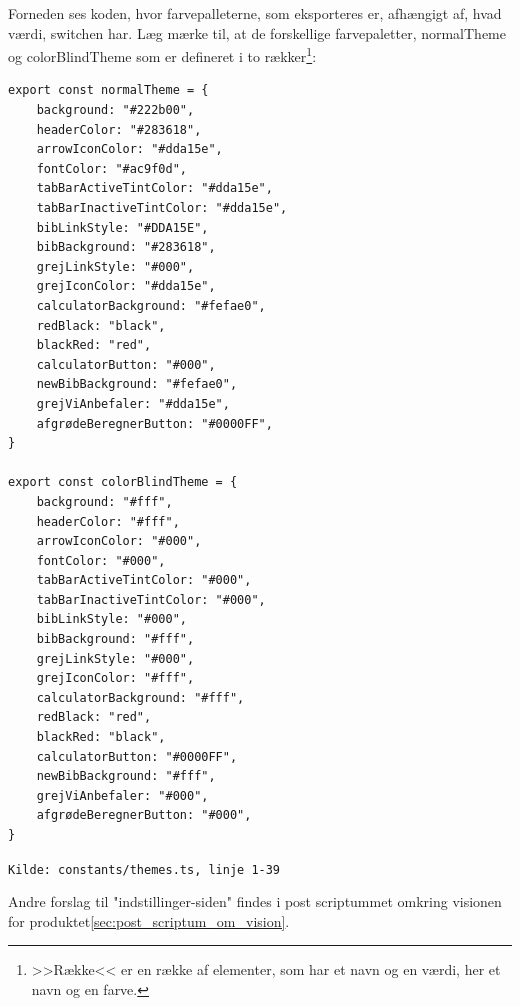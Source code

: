 Forneden ses koden, hvor farvepalleterne, som eksporteres er, afhængigt af, hvad værdi, switchen har. Læg mærke til, at de forskellige farvepaletter, normalTheme og colorBlindTheme som er defineret i to rækker\footnote{>>Række<< er en række af elementer, som har et navn og en værdi, her et navn og en farve.}:
\begin{mdframed}[backgroundcolor=blue!5]
\begin{verbatim}
export const normalTheme = {
    background: "#222b00",
    headerColor: "#283618",
    arrowIconColor: "#dda15e",
    fontColor: "#ac9f0d",
    tabBarActiveTintColor: "#dda15e",
    tabBarInactiveTintColor: "#dda15e",
    bibLinkStyle: "#DDA15E",
    bibBackground: "#283618",
    grejLinkStyle: "#000",
    grejIconColor: "#dda15e",
    calculatorBackground: "#fefae0",
    redBlack: "black",
    blackRed: "red",
    calculatorButton: "#000",
    newBibBackground: "#fefae0",
    grejViAnbefaler: "#dda15e",
    afgrødeBeregnerButton: "#0000FF",
}

export const colorBlindTheme = {
    background: "#fff",
    headerColor: "#fff",
    arrowIconColor: "#000",
    fontColor: "#000",
    tabBarActiveTintColor: "#000",
    tabBarInactiveTintColor: "#000",
    bibLinkStyle: "#000",
    bibBackground: "#fff",
    grejLinkStyle: "#000",
    grejIconColor: "#fff",
    calculatorBackground: "#fff",
    redBlack: "red",
    blackRed: "black",
    calculatorButton: "#0000FF",
    newBibBackground: "#fff",
    grejViAnbefaler: "#000",
    afgrødeBeregnerButton: "#000",
}
\end{verbatim}
\end{mdframed}
\footnotesize\texttt{Kilde: constants/themes.ts, linje 1-39}

Andre forslag til "indstillinger-siden" \space findes i post scriptummet omkring visionen for produktet\ref{sec:post_scriptum_om_vision}.